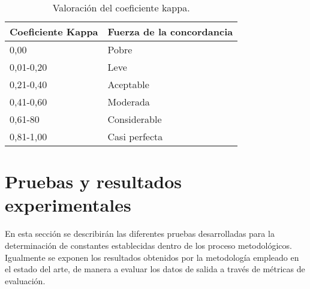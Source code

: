 		\begin{table}[H]
			\centering
			\begin{tabular}{|l|l|}
				\hline
				\rowcolor[HTML]{EFEFEF} 
				\textbf{Coeficiente Kappa} & \textbf{Fuerza de la concordancia} \\ \hline
				0,00                       & Pobre                              \\ \hline
				0,01-0,20                  & Leve                               \\ \hline
				0,21-0,40                  & Aceptable                          \\ \hline
				0,41-0,60                  & Moderada                           \\ \hline
				0,61-80                    & Considerable                       \\ \hline
				0,81-1,00                  & Casi perfecta                      \\ \hline
			\end{tabular}
						\caption{Valoración del coeficiente kappa\cite{landis1977measurement}.}
						\label{t:kappaTable}
		\end{table}
		


\section{Pruebas y resultados experimentales}
En esta secci\'on se describir\'an las diferentes pruebas desarrolladas para la determinaci\'on de constantes establecidas dentro de los proceso metodol\'ogicos. Igualmente se exponen los resultados obtenidos por la metodolog\'ia empleado en el estado del arte, de manera a evaluar los datos de salida a trav\'es de m\'etricas de evaluaci\'on.
